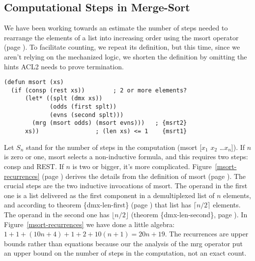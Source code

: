 \subsection{Computational Steps in Merge-Sort}
\label{subsec:msort-steps}

We have been working towards an estimate the number of steps
needed to rearrange the elements of a list into increasing order
using the msort operator (page \pageref{defun:msort}).
To facilitate counting, we repeat its definition,
but this time, since we aren't relying on the mechanized logic,
we shorten the definition by omitting the hints
ACL2 needs to prove termination.

\label{defun:msort-copy}
\begin{Verbatim}
(defun msort (xs)
  (if (consp (rest xs))        ; 2 or more elements?
      (let* ((splt (dmx xs))
             (odds (first splt))
             (evns (second splt)))
        (mrg (msort odds) (msort evns)))   ; {msrt2}
      xs))                ; (len xs) <= 1    {msrt1}
\end{Verbatim}

Let $S_n$ stand for the number of steps in the computation
(msort [$x_1$ $x_2$ \dots $x_n$]).
If $n$ is zero or one, msort selects a non-inductive
formula, and this requires two steps: consp and REST.
If $n$ is two or bigger, it's more complicated.
Figure~\ref{msort-recurrences} (page \pageref{msort-recurrences})
derives the details from the definition of msort (page \pageref{defun:msort-copy}).
The crucial steps are the two inductive invocations of msort.
The operand in the first one is a list delivered as the first component in
a demultiplexed list of $n$ elements, and according to
theorem \{dmx-len-first\} (page \pageref{thm:dmx-length-first-second})
that list has $\lceil  n/2 \rceil$ elements.
The operand in the second one has $\lfloor n/2 \rfloor$
(theorem \{dmx-len-second\}, page \pageref{thm:dmx-length-first-second}).
In Figure~\ref{msort-recurrences} we have
done a little algebra: $1 + 1 + (10n+4) + 1 + 2 + 10(n+1) = 20n + 19$.
The recurrences are upper bounds rather than equations because
our the analysis of the mrg operator put an upper bound on
the number of steps in the computation, not an exact count.

